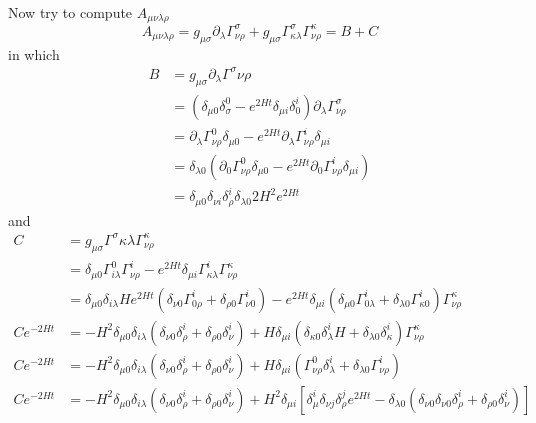 \begin{enumerate}[label=(\alph*)]
      Now try to compute $A_{\mu\nu\lambda \rho}$
      \begin{equation*}
         A_{\mu\nu\lambda \rho} = g_{\mu\sigma} \partial_\lambda \Gamma^\sigma_{\nu\rho} + g_{\mu\sigma} \Gamma^{\sigma}_{\kappa \lambda}\Gamma^{\kappa}_{\nu\rho} = B + C
      \end{equation*}
      in which
      \begin{align*}
         B & = g_{\mu\sigma}\partial_\lambda \Gamma^{\sigma}{\nu\rho} \\
           &= \left( \delta_{\mu 0} \delta_{\sigma}^0 - e^{2Ht} \delta_{\mu i} \delta^{i}_0 \right) \partial_\lambda \Gamma^\sigma_{\nu\rho} \\
           &= \partial_\lambda \Gamma^0_{\nu\rho} \delta_{\mu 0} - e^{2Ht} \partial_\lambda \Gamma^i_{\nu\rho} \delta_{\mu i} \\
           &= \delta_{\lambda 0} \left( \partial_0 \Gamma^{0}_{\nu\rho} \delta_{\mu 0} - e^{2Ht}\partial_0 \Gamma^i_{\nu\rho} \delta_{\mu i} \right) \\
           &= \delta_{\mu 0}  \delta_{\nu i} \delta^i_{\rho} \delta_{\lambda 0} 2 H^2 e^{2Ht}
      \end{align*}
      and
      \begin{align*}
         C &= g_{\mu\sigma} \Gamma^{\sigma}{\kappa \lambda} \Gamma^{\kappa}_{\nu \rho} \\
           &= \delta_{\mu 0} \Gamma^{0}_{i\lambda} \Gamma^{i}_{\nu\rho} - e^{2Ht} \delta_{\mu i} \Gamma^{i}_{\kappa \lambda} \Gamma^{\kappa}_{\nu\rho} \\
           &= \delta_{\mu 0} \delta_{i\lambda} He^{2Ht} \left( \delta_{\nu 0} \Gamma^{i}_{0 \rho} + \delta_{\rho 0} \Gamma^{i}_{\nu 0} \right) - e^{2Ht} \delta_{\mu i} \left( \delta_{\mu 0} \Gamma^{i}_{0\lambda} +\delta_{\lambda 0} \Gamma^i_{\kappa 0} \right) \Gamma^{\kappa}_{\nu\rho} \\
         C e^{-2Ht} &= - H^2 \delta_{\mu 0} \delta_{i \lambda} \left( \delta_{\nu 0} \delta^i_\rho + \delta_{\rho 0} \delta^i_\nu \right) + H \delta_{\mu i} \left( \delta_{\kappa 0}\delta^i_\lambda H + \delta_{\lambda 0} \delta^{i}_\kappa \right) \Gamma^\kappa_{\nu\rho} \\
         C e^{-2Ht} &= - H^2 \delta_{\mu 0} \delta_{i \lambda} \left( \delta_{\nu 0} \delta^i_\rho + \delta_{\rho 0} \delta^i_\nu \right) + H \delta_{\mu i} \left( \Gamma^{0}_{\nu\rho} \delta^i_\lambda + \delta_{\lambda 0} \Gamma^{i}_{\nu \rho} \right) \\ 
         C e^{-2Ht} &= - H^2 \delta_{\mu 0} \delta_{i \lambda} \left( \delta_{\nu 0} \delta^i_\rho + \delta_{\rho 0} \delta^i_\nu \right) + H^2 \delta_{\mu i} \left[ \delta^i_\mu \delta_{\nu j} \delta^j_\rho e^{2Ht} - \delta_{\lambda 0} \left( \delta_{\nu 0} \delta_{\nu 0} \delta^i_{\rho} + \delta_{\rho 0} \delta^i_\nu \right) \right] \\

\end{align*}
\end{enumerate}
